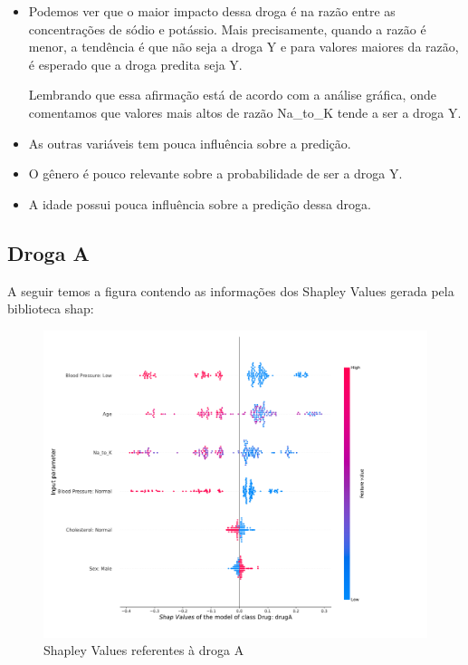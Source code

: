 \documentclass[12pt,a4paper]{article}
\theoremstyle{definition}
\theoremstyle{theoremdd}
\begin{document}
\begin{itemize}
\item Podemos ver que o maior impacto dessa droga é na razão entre as concentrações de sódio e potássio. Mais precisamente, quando a razão é menor, a tendência é que não seja a droga Y e para valores maiores da razão, é esperado que a droga predita seja Y.

Lembrando que essa afirmação está de acordo com a análise gráfica, onde comentamos que valores mais altos de razão Na\_to\_K tende a ser a droga Y.



\item As outras variáveis tem pouca influência sobre a predição.

\item O gênero é pouco relevante sobre a probabilidade de ser a droga Y.

\item A idade  possui pouca influência sobre a predição dessa droga.
\end{itemize}


\subsection{Droga A}
A seguir temos a figura contendo as informações dos Shapley Values gerada pela biblioteca shap:
\begin{center}
\begin{figure}[H]
	\centering
	\includegraphics[scale=.40]{shap_drugA.pdf}
	\caption{Shapley Values referentes à droga A}
	\label{fig:04}
\end{figure}
\end{center}
\end{document}
